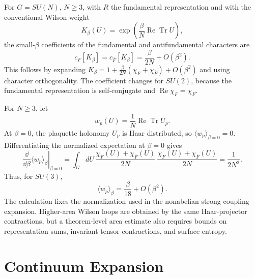 For \(G=SU(N)\), \(N\ge3\), with \(R\) the fundamental representation and
with the conventional Wilson weight
\begin{equation}
  K_\beta(U)=
  \exp\!\left(\frac{\beta}{N}\operatorname{Re}\operatorname{Tr}U\right),
  \label{eq:suN-fundamental-wilson-weight}
\end{equation}
the small-\(\beta\) coefficients of the fundamental and antifundamental
characters are
\begin{equation}
  c_F[K_\beta]=c_{\overline F}[K_\beta]
  =
  \frac{\beta}{2N}+O(\beta^2).
  \label{eq:suN-fundamental-character-coefficient}
\end{equation}
This follows by expanding \(K_\beta=1+\frac{\beta}{2N}(\chi_F+\chi_{\bar F})
 +O(\beta^2)\) and using character orthogonality.  The coefficient changes
for \(SU(2)\), because the fundamental representation is self-conjugate and
\(\operatorname{Re}\chi_F=\chi_F\).

\begin{example}
\label{ex:suN-fundamental-plaquette-strong-coupling-normalization}
For \(N\ge3\), let
\[
  w_p(U)=\frac1N\operatorname{Re}\operatorname{Tr}U_p .
\]
At \(\beta=0\), the plaquette holonomy \(U_p\) is Haar distributed, so
\(\langle w_p\rangle_{\beta=0}=0\).  Differentiating the normalized
expectation at \(\beta=0\) gives
\begin{equation}
  \left.\frac{\dd}{\dd\beta}\langle w_p\rangle_\beta\right|_{\beta=0}
  =
  \int_G dU\,
  \frac{\chi_F(U)+\chi_{\bar F}(U)}{2N}\,
  \frac{\chi_F(U)+\chi_{\bar F}(U)}{2N}
  =
  \frac{1}{2N^2}.
  \label{eq:suN-one-plaquette-slope}
\end{equation}
Thus, for \(SU(3)\),
\begin{equation}
  \langle w_p\rangle_\beta
  =
  \frac{\beta}{18}+O(\beta^2).
  \label{eq:su3-one-plaquette-slope}
\end{equation}
The calculation fixes the normalization used in the nonabelian
strong-coupling expansion.  Higher-area Wilson loops are obtained by the
same Haar-projector contractions, but a theorem-level area estimate also
requires bounds on representation sums, invariant-tensor contractions, and
surface entropy.
\end{example}

\section{Continuum Expansion}

